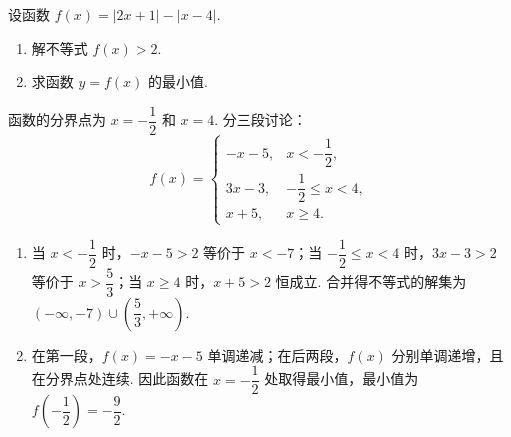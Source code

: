 \begin{problem}
设函数 \( f(x) = |2x + 1| - |x - 4| \).
\begin{enumerate}
\item 解不等式 \( f(x) > 2 \).
\item 求函数 \( y = f(x) \) 的最小值.
\end{enumerate}
\end{problem}

\begin{solution}
函数的分界点为 \(x=-\dfrac{1}{2}\) 和 \(x=4\). 分三段讨论：
\[
f(x)=
\begin{cases}
-x-5, & x< -\dfrac{1}{2},\\
3x-3, & -\dfrac{1}{2}\leqslant x<4,\\
x+5, & x\geqslant4.
\end{cases}
\]

\begin{enumerate}
\item 当 \(x< -\dfrac{1}{2}\) 时，\(-x-5>2\) 等价于 \(x<-7\)；当 \(-\dfrac{1}{2}\leqslant x<4\) 时，\(3x-3>2\) 等价于 \(x>\dfrac{5}{3}\)；当 \(x\geqslant4\) 时，\(x+5>2\) 恒成立. 合并得不等式的解集为 \(\left(-\infty,-7\right)\cup\left(\dfrac{5}{3},+\infty\right)\).
\item 在第一段，\(f(x)=-x-5\) 单调递减；在后两段，\(f(x)\) 分别单调递增，且在分界点处连续. 因此函数在 \(x=-\dfrac{1}{2}\) 处取得最小值，最小值为 \(f\left(-\dfrac{1}{2}\right)=-\dfrac{9}{2}\).
\end{enumerate}
\end{solution}
